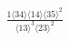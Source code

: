 \documentclass[varwidth, border=5pt]{standalone}
\begin{document}
\begin{my}
$\begin{gathered}
\scriptscriptstyle\frac{1⟨34⟩⟨14⟩⟨35⟩^2}{⟨13⟩^3⟨23⟩^2}
\end{gathered}$
\end{my}
\end{document}

